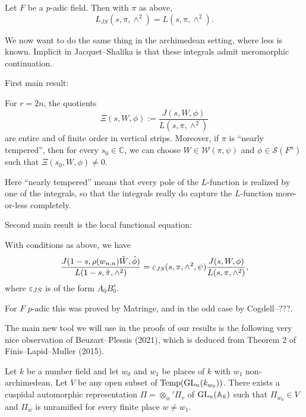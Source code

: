 \documentclass[reqno]{amsart} 
\begin{document}
\begin{theorem}[Kewat--R, Y.\ Jo]\label{theorem:cnojbgtred}
  Let $F$ be a $p$-adic field.  Then with $\pi$ as above,
  \begin{equation*}
    L_{JS}(s, \pi, \wedge^2)
    =
    L(s, \pi, \wedge^2).
  \end{equation*}
\end{theorem}

We now want to do the same thing in the archimedean setting, where less is known.  Implicit in Jacquet--Shalika is that these integrals admit meromorphic continuation.

First main result:

\begin{theorem}\label{theorem:cnojbgttz1}
  For $r = 2 n$, the quotients
  \begin{equation*}
    \Xi(s, W, \phi) := \frac{J(s, W, \phi)}{ L(s, \pi, \wedge^2)}
  \end{equation*}
  are entire and of finite order in vertical strips.  Moreover, if $\pi$ is ``nearly tempered'', then for every $s_0 \in \mathbb{C}$, we can choose $W \in \mathcal{W}(\pi, \psi)$ and $\phi \in \mathcal{S}(F^n)$ such that $\Xi(s_0, W, \phi) \neq 0$.
\end{theorem}

Here ``nearly tempered'' means that every pole of the $L$-function is realized by one of the integrals, so that the integrals really do capture the $L$-function more-or-less completely.

Second main result is the local functional equation:
\begin{theorem}
  With conditions as above, we have
  \begin{equation*}
    \frac{J(1 - s, \rho(w_{n, n}) \tilde{W}, \hat{\phi})}{L(1 - s, \tilde{\pi}, \wedge^2)}
    = \varepsilon_{J S}(s, \pi, \wedge^2, \psi)
    \frac{J(s, W, \phi)}{L(s, \pi, \wedge^2)},
  \end{equation*}
  where $\varepsilon_{J S}$ is of the form $A_0 B_0^s$.
\end{theorem}
For $F$ $p$-adic this was proved by Matringe, and in the odd case by Cogdell--???.

The main new tool we will use in the proofs of our results is the following very nice observation of Beuzart--Plessis (2021), which is deduced from Theorem 2 of Finis--Lapid--Muller (2015).

\begin{theorem}
  Let $k$ be a number field and let $w_0$ and $w_1$ be places of $k$ with $w_1$ non-archimedean.  Let $V$ be any open subset of $\operatorname{Temp}(\operatorname{GL}_n(k_{w_0}))$.  There exists a cuspidal automorphic representation $\Pi = \otimes_w ' \Pi_v$ of $\operatorname{GL}_n(\mathbb{A}_k)$ such that $\Pi_{w_0} \in V$ and $\Pi_w$ is unramified for every finite place $w \neq w_1$.
\end{theorem}
\end{document}
